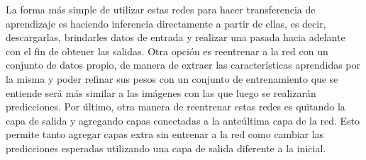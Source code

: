 La forma más simple de utilizar estas redes para hacer transferencia de aprendizaje es haciendo inferencia directamente a partir de ellas, es decir, descargarlas, brindarles datos de entrada y realizar una pasada hacia adelante con el fin de obtener las salidas. Otra opción es reentrenar a la red con un conjunto de datos propio, de manera de extraer las características aprendidas por la misma y poder refinar sus pesos con un conjunto de entrenamiento que se entiende será más similar a las imágenes con las que luego se realizarán predicciones. Por último, otra manera de reentrenar estas redes es quitando la capa de salida y agregando capas conectadas a la anteúltima capa de la red. Esto permite tanto agregar capas extra sin entrenar a la red como cambiar las predicciones esperadas utilizando una capa de salida diferente a la inicial.
